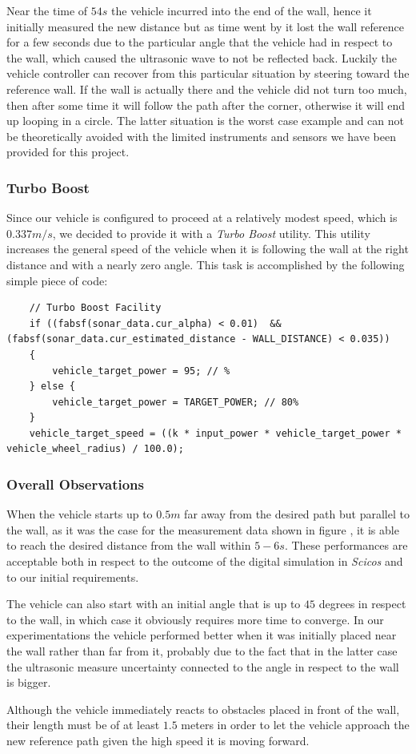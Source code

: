 Near the time of $54s$ the vehicle incurred into the end of the wall, hence it initially measured the new distance but as time went by it lost the wall reference for a few seconds due to the particular angle that the vehicle had in respect to the wall, which caused the ultrasonic wave to not be reflected back. Luckily the vehicle controller can recover from this particular situation by steering toward the reference wall. If the wall is actually there and the vehicle did not turn too much, then after some time it will follow the path after the corner, otherwise it will end up looping in a circle. The latter situation is the worst case example and can not be theoretically avoided with the limited instruments and sensors we have been provided for this project.

\subsubsection{Turbo Boost}

Since our vehicle is configured to proceed at a relatively modest speed, which is $0.337 m/s$, we decided to provide it with a \textit{Turbo Boost} utility. This utility increases the general speed of the vehicle when it is following the wall at the right distance and with a nearly zero angle. This task is accomplished by the following simple piece of code:

\begin{lstlisting}
    // Turbo Boost Facility
    if ((fabsf(sonar_data.cur_alpha) < 0.01)  && (fabsf(sonar_data.cur_estimated_distance - WALL_DISTANCE) < 0.035))
    {
        vehicle_target_power = 95; // %
    } else {
        vehicle_target_power = TARGET_POWER; // 80%
    }
    vehicle_target_speed = ((k * input_power * vehicle_target_power * vehicle_wheel_radius) / 100.0);
\end{lstlisting}

\subsubsection{Overall Observations}

When the vehicle starts up to $0.5m$ far away from the desired path but parallel to the wall, as it was the case for the measurement data shown in figure \label{fig:sonar02}, it is able to reach the desired distance from the wall within $5-6s$. These performances are acceptable both in respect to the outcome of the digital simulation in \textit{Scicos} and to our initial requirements.

The vehicle can also start with an initial angle that is up to $45$ degrees in respect to the wall, in which case it obviously requires more time to converge. In our experimentations the vehicle performed better when it was initially placed near the wall rather than far from it, probably due to the fact that in the latter case the ultrasonic measure uncertainty connected to the angle in respect to the wall is bigger.

Although the vehicle immediately reacts to obstacles placed in front of the wall, their length must be of at least $1.5$ meters in order to let the vehicle approach the new reference path given the high speed it is moving forward.
